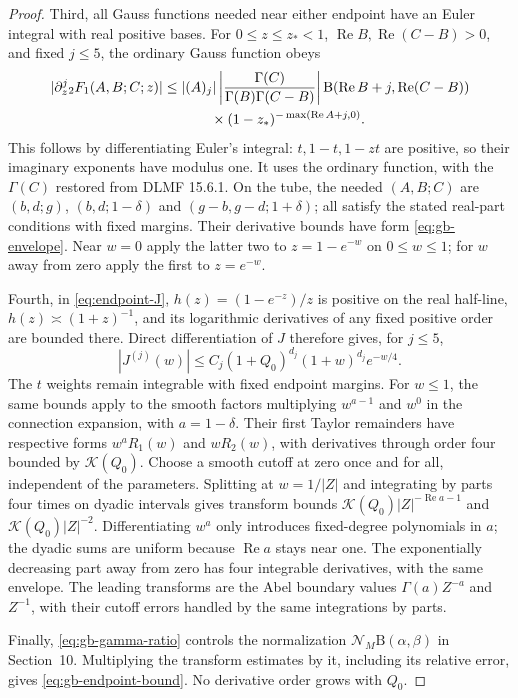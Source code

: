 \begin{proof}
Third, all Gauss functions needed near either endpoint have an Euler
integral with real positive bases. For $0\le z\le z_*<1$,
$\operatorname{Re}B,\operatorname{Re}(C-B)>0$, and fixed $j\le5$,
the ordinary Gauss function obeys
\begin{align}
 |\partial_z^j{}_2F_1(A,B;C;z)|
 &\le |(A)_j|\left|\frac{\Gamma(C)}{\Gamma(B)\Gamma(C-B)}\right|
 \mathrm B(\operatorname{Re}B+j,\operatorname{Re}(C-B))\notag\\
 &\hspace{12mm}\times
 (1-z_*)^{-\max(\operatorname{Re}A+j,0)}.
 \label{eq:gb-euler-derivative}
\end{align}
This follows by differentiating Euler's integral: $t,1-t,1-zt$ are
positive, so their imaginary exponents have modulus one. It uses the
ordinary function, with the $\Gamma(C)$ restored from DLMF 15.6.1.
On the tube, the needed $(A,B;C)$ are $(b,d;g)$,
$(b,d;1-\delta)$ and $(g-b,g-d;1+\delta)$; all satisfy the stated
real-part conditions with fixed margins. Their derivative bounds have
form \eqref{eq:gb-envelope}. Near $w=0$ apply the latter two to
$z=1-e^{-w}$ on $0\le w\le1$; for $w$ away from zero apply the first
to $z=e^{-w}$.

Fourth, in \eqref{eq:endpoint-J}, $h(z)=(1-e^{-z})/z$ is positive
on the real half-line, $h(z)\asymp(1+z)^{-1}$, and its logarithmic
derivatives of any fixed positive order are bounded there. Direct
differentiation of $J$ therefore gives, for $j\le5$,
\begin{equation}
 |J^{(j)}(w)|\le C_j(1+Q_0)^{d_j}(1+w)^{d_j}e^{-w/4}.
 \label{eq:gb-J-bound}
\end{equation}
The $t$ weights remain integrable with fixed endpoint margins.
For $w\le1$, the same bounds apply to the smooth factors multiplying
$w^{a-1}$ and $w^0$ in the connection expansion, with
$a=1-\delta$. Their first Taylor remainders have respective forms
$w^a R_1(w)$ and $wR_2(w)$, with derivatives through order four bounded by
$\mathcal K(Q_0)$. Choose a smooth cutoff at zero once and for all,
independent of the parameters. Splitting at $w=1/|Z|$ and integrating
by parts four times on dyadic intervals gives transform bounds
$\mathcal K(Q_0)|Z|^{-\operatorname{Re}a-1}$ and
$\mathcal K(Q_0)|Z|^{-2}$. Differentiating $w^a$ only introduces
fixed-degree polynomials in $a$; the dyadic sums are uniform because
$\operatorname{Re}a$ stays near one. The exponentially decreasing
part away from zero has four integrable derivatives, with the same
envelope. The leading transforms are the Abel boundary values
$\Gamma(a)Z^{-a}$ and $Z^{-1}$, with their cutoff errors handled by
the same integrations by parts.

Finally, \eqref{eq:gb-gamma-ratio} controls the normalization
$\mathcal N_M\mathrm B(\alpha,\beta)$ in Section~10. Multiplying
the transform estimates by it, including its relative error, gives
\eqref{eq:gb-endpoint-bound}. No derivative order grows with $Q_0$.
\end{proof}

